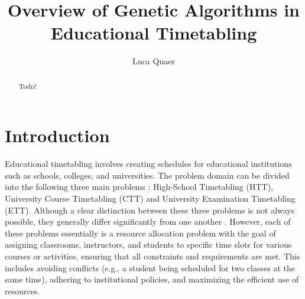\documentclass[sigconf]{acmart}
\begin{document}
\title{Overview of Genetic Algorithms in Educational Timetabling}

\author{Luca Quaer}





\begin{abstract}
Todo!
\end{abstract}




\maketitle



\section{Introduction}
Educational timetabling involves creating schedules for educational
institutions such as schools, colleges, and universities.
The problem domain can be divided into the following three main problems
\cite{kingston2013educational,schaerf1999survey}:
High-School Timetabling (HTT), University Course Timetabling (CTT) and
University Examination Timetabling (ETT).
Although a clear distinction between these three problems is not always
possible, they generally differ significantly from one another
\cite{Beligiannis2009}.
However, each of these problems essentially is a resource allocation problem
with the goal of assigning classrooms, instructors, and students to specific
time slots for various courses or activities, ensuring that all constraints and
requirements are met.
This includes avoiding conflicts (e.g., a student being scheduled for two
classes at the same time), adhering to institutional policies, and maximizing
the efficient use of resources.
\end{document}
